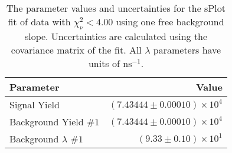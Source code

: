 
\begin{table}[ht]
    \begin{center}
        \begin{tabular}{lr}\toprule
            Parameter & Value \\\midrule
            Signal Yield & $(7.43444 \pm 0.00010) \times 10^{4}$ \\
            Background Yield $\#1$ & $(7.43444 \pm 0.00010) \times 10^{4}$ \\
            Background $\lambda$ $\#1$ & $(9.33 \pm 0.10) \times 10^{1}$ \\\bottomrule
        \end{tabular}
        \caption{The parameter values and uncertainties for the sPlot fit of data with $\chi^2_\nu < 4.00$ using one free background slope. Uncertainties are calculated using the covariance matrix of the fit. All $\lambda$ parameters have units of $\si{\nano\second}^{-1}$.}\label{tab:splot-fit-results-chisqdof-4.00-free-1}
    \end{center}
\end{table}
